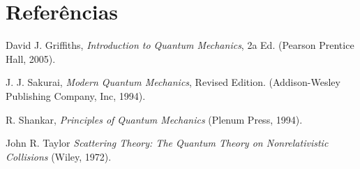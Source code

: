 \documentclass{article}
\begin{document}
\section{Referências}

\noindent [1] David J. Griffiths, \textit{Introduction to Quantum Mechanics}, 2a Ed. (Pearson Prentice Hall, 2005).

\noindent [2] J. J. Sakurai, \textit{Modern Quantum Mechanics}, Revised Edition. (Addison-Wesley Publishing Company, Inc, 1994).

\noindent [3] R. Shankar, \textit{Principles of Quantum Mechanics} (Plenum Press, 1994).

\noindent [2] John R. Taylor \textit{Scattering Theory: The Quantum Theory on Nonrelativistic Collisions} (Wiley, 1972).
\end{document}
